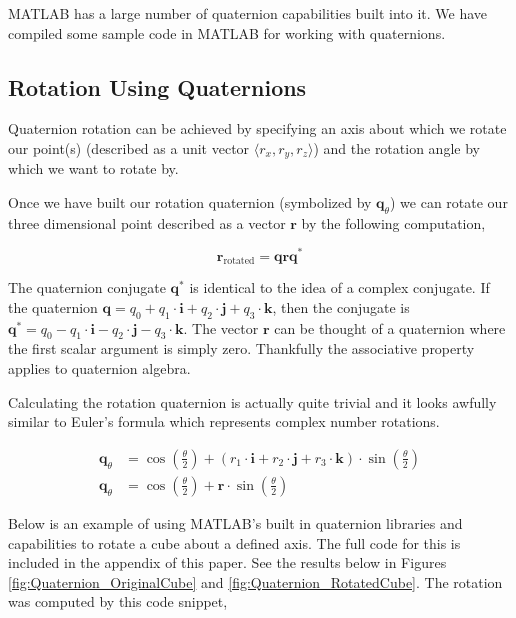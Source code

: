 \documentclass[10pt, letterpaper]{article}
\begin{document}
MATLAB has a large number of quaternion capabilities built into it. We have compiled some sample code in MATLAB for working with quaternions.

\subsection{Rotation Using Quaternions}

Quaternion rotation can be achieved by specifying an axis about which we rotate our point(s) (described as a unit vector $\langle r_{x}, r_{y}, r_{z} \rangle$) and the rotation angle by which we want to rotate by.

Once we have built our rotation quaternion (symbolized by $\mathbf{q}_{\theta}$) we can rotate our three dimensional point described as a vector $\mathbf{r}$ by the following computation,

\begin{equation*}
    \mathbf{r}_{\text{rotated}} = \mathbf{q} \mathbf{r} \mathbf{q^{*}}
\end{equation*}

The quaternion conjugate $\mathbf{q}^{*}$ is identical to the idea of a complex conjugate. If the quaternion $\mathbf{q} = q_{0} + q_{1} \cdot \mathbf{i} + q_{2} \cdot \mathbf{j} + q_{3} \cdot \mathbf{k}$, then the conjugate is $\mathbf{q}^{*} = q_{0} - q_{1} \cdot \mathbf{i} - q_{2} \cdot \mathbf{j} - q_{3} \cdot \mathbf{k}$. The vector $\mathbf{r}$ can be thought of a quaternion where the first scalar argument is simply zero. Thankfully the associative property applies to quaternion algebra.

Calculating the rotation quaternion is actually quite trivial and it looks awfully similar to Euler's formula which represents complex number rotations.

\begin{align*}
    \mathbf{q}_{\theta} &= \cos{\left(\frac{\theta}{2}\right)} + (r_{1} \cdot \mathbf{i} + r_{2} \cdot \mathbf{j} + r_{3} \cdot \mathbf{k}) \cdot \sin{\left(\frac{\theta}{2}\right)} \\
    \mathbf{q}_{\theta} &= \cos{\left(\frac{\theta}{2}\right)} + \mathbf{r} \cdot \sin{\left(\frac{\theta}{2}\right)}
\end{align*}

Below is an example of using MATLAB's built in quaternion libraries and capabilities to rotate a cube about a defined axis. The full code for this is included in the appendix of this paper. See the results below in Figures \ref{fig:Quaternion_OriginalCube} and \ref{fig:Quaternion_RotatedCube}. The rotation was computed by this code snippet,
\end{document}
